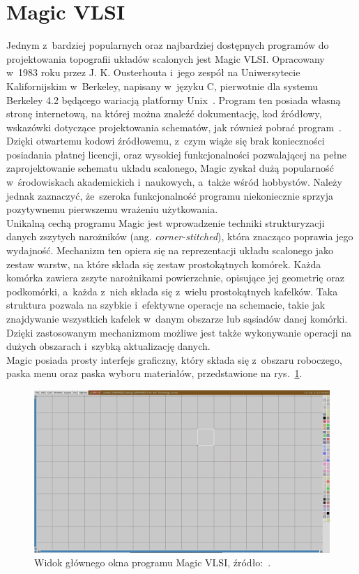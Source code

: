 \section{Magic VLSI}

Jednym z~bardziej popularnych oraz najbardziej dostępnych programów do projektowania topografii układów scalonych
jest Magic VLSI\@.
Opracowany w~1983 roku przez J. K. Ousterhouta i~jego zespół na Uniwersytecie Kalifornijskim w~Berkeley,
napisany w~języku C, pierwotnie dla systemu Berkeley 4.2 będącego wariacją platformy Unix~\cite{MAGIC_article}.
Program ten posiada własną stronę internetową, na której można znaleźć dokumentację, kod źródłowy,
wskazówki dotyczące projektowania schematów, jak również pobrać program~\cite{MAGIC_site}.
Dzięki otwartemu kodowi źródłowemu, z~czym wiąże się brak konieczności posiadania płatnej licencji,
oraz wysokiej funkcjonalności pozwalającej na pełne zaprojektowanie schematu układu scalonego,
Magic zyskał dużą popularność
w~środowiskach akademickich i~naukowych, a~także wśród hobbystów.
Należy jednak zaznaczyć, że~szeroka funkcjonalność programu
niekoniecznie sprzyja pozytywnemu pierwszemu wrażeniu użytkowania.\\ %
\indent Unikalną cechą programu Magic jest wprowadzenie techniki strukturyzacji danych
zszytych narożników (ang. \textit{corner-stitched}),
która znacząco poprawia jego wydajność.
Mechanizm ten opiera się na reprezentacji układu scalonego jako zestaw warstw,
na które składa się zestaw prostokątnych komórek.
Każda komórka zawiera zszyte narożnikami powierzchnie,
opisujące jej geometrię oraz podkomórki, a~każda z~nich składa się z~wielu prostokątnych kafelków.
Taka struktura pozwala na szybkie i~efektywne operacje na schemacie,
takie jak znajdywanie wszystkich kafelek w~danym obszarze lub sąsiadów danej komórki.
Dzięki zastosowanym mechanizmom możliwe jest także wykonywanie operacji na dużych obszarach
i~szybką aktualizację danych.\\
\indent Magic posiada prosty interfejs graficzny,
który składa się z~obszaru roboczego, paska menu oraz paska wyboru materiałów,
przedstawione na rys.~\ref{fig:magic_okno}.

\begin{figure}[h]
    \centering
    \includegraphics[width=.9\textwidth]{chapters/chapter2/img/magic_okno}
    \caption[Widok głównego okna programu Magic VLSI.]{Widok głównego okna programu Magic VLSI, źródło:~\cite{MAGIC_site}.}
    \label{fig:magic_okno}
\end{figure}

